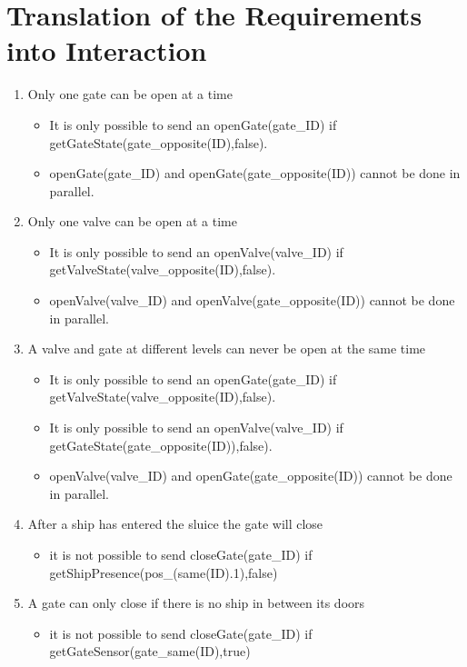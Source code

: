 \section{Translation of the Requirements into Interaction}
\begin{enumerate}
	\item Only one gate can be open at a time
	
		\begin{itemize}
			\item It is only possible to send an openGate(gate\_ID) if getGateState(gate\_opposite(ID),false).
			\item openGate(gate\_ID) and openGate(gate\_opposite(ID)) cannot be done in parallel.
			
		\end{itemize}
	
	\item Only one valve can be open at a time
	
		\begin{itemize}
			\item It is only possible to send an openValve(valve\_ID) if getValveState(valve\_opposite(ID),false).
			\item openValve(valve\_ID) and openValve(gate\_opposite(ID)) cannot be done in parallel.
		\end{itemize}
	
	\item A valve and gate at different levels can never be open at the same time
		\begin{itemize}
			\item It is only possible to send an openGate(gate\_ID) if getValveState(valve\_opposite(ID),false).
			\item It is only possible to send an openValve(valve\_ID) if getGateState(gate\_opposite(ID)),false).
			\item openValve(valve\_ID) and openGate(gate\_opposite(ID)) cannot be done in parallel.
		\end{itemize}
	
	\item After a ship has entered the sluice the gate will close
	\begin{itemize}
		\item it is not possible to send closeGate(gate\_ID) if getShipPresence(pos\_(same(ID).1),false)
		
	\end{itemize}
	\item A gate can only close if there is no ship in between its doors
	\begin{itemize}
		\item it is not possible to send closeGate(gate\_ID) if getGateSensor(gate\_same(ID),true)
	\end{itemize}
	

\end{enumerate}
